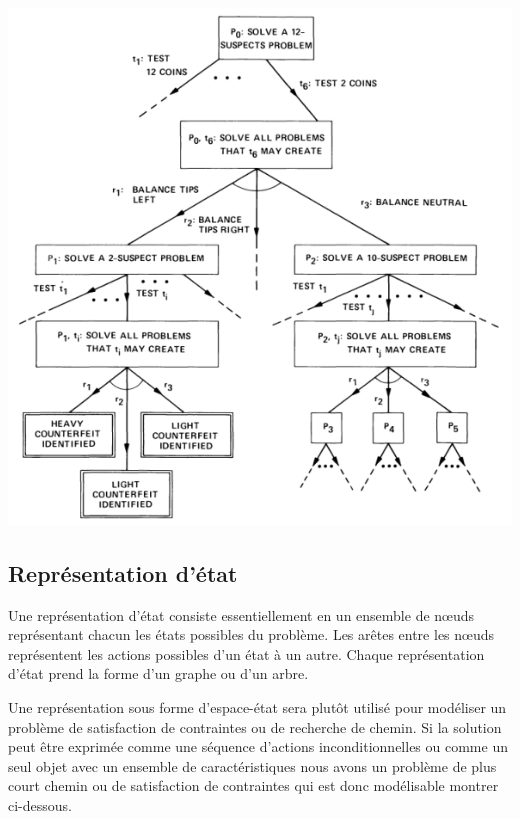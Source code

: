 \begin{center}
    \includegraphics[scale=0.8]{../ressources/images/counterfeit_problem_and_or_graph.png}
\end{center}


\subsection{Représentation d'état}
Une représentation d'état consiste essentiellement en un ensemble de nœuds représentant chacun les états possibles du problème. Les arêtes entre les nœuds représentent les actions possibles d'un état à un autre. 
Chaque représentation d'état prend la forme d'un graphe ou d'un arbre.

Une représentation sous forme d'espace-état sera plutôt utilisé pour modéliser un problème de satisfaction de contraintes ou de recherche de chemin.
Si la solution peut être exprimée comme une séquence d'actions inconditionnelles ou comme un seul objet avec un ensemble de caractéristiques nous avons un problème de plus court chemin ou de satisfaction de contraintes qui est donc modélisable montrer ci-dessous.

